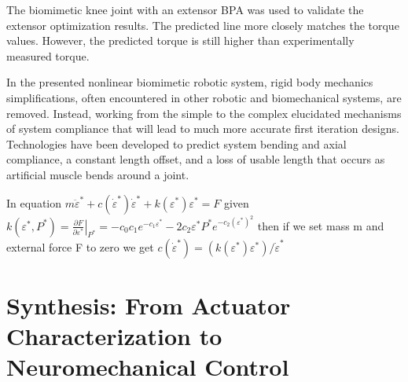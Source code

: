 The biomimetic knee joint with an extensor BPA was used to validate the extensor optimization results. The predicted line more closely matches the torque values. However, the predicted torque is still higher than experimentally measured torque.


In the presented nonlinear biomimetic robotic system, rigid body mechanics simplifications, often encountered in other robotic and biomechanical systems, are removed. Instead, working from the simple to the complex elucidated mechanisms of system compliance that will lead to much more accurate first iteration designs. Technologies have been developed to predict system bending and axial compliance, a constant length offset, and a loss of usable length that occurs as artificial muscle bends around a joint. 

In equation $m\ddot \varepsilon^* + c (\dot \varepsilon^* ) \dot \varepsilon^* + k ( \varepsilon^* ) \varepsilon^* = F$ given $k(\varepsilon^{*}, P^{*})
= \left.\frac{\partial F}{\partial \varepsilon^{*}}\right|_{P^{*}}
= -c_{0}c_{1}e^{-c_{1}\varepsilon^{*}}
  - 2c_{2}\varepsilon^{*}P^{*}e^{-c_{2}(\varepsilon^{*})^{2}}$
then if we set mass m and external force F to zero we get
$c (\dot \varepsilon^* ) = (k ( \varepsilon^* ) \varepsilon^*)/\dot \varepsilon^*$


\section{Synthesis: From Actuator Characterization to Neuromechanical Control}\label{sec:synthesis}

